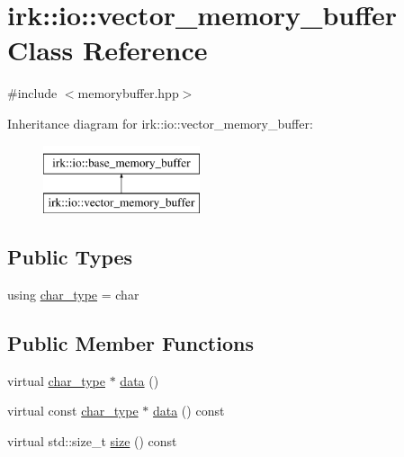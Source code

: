 \hypertarget{classirk_1_1io_1_1vector__memory__buffer}{}\section{irk\+:\+:io\+:\+:vector\+\_\+memory\+\_\+buffer Class Reference}
\label{classirk_1_1io_1_1vector__memory__buffer}


{\ttfamily \#include $<$memorybuffer.\+hpp$>$}

Inheritance diagram for irk\+:\+:io\+:\+:vector\+\_\+memory\+\_\+buffer\+:\begin{figure}[H]
\begin{center}
\leavevmode
\includegraphics[height=2.000000cm]{classirk_1_1io_1_1vector__memory__buffer}
\end{center}
\end{figure}
\subsection*{Public Types}
\begin{DoxyCompactItemize}
\item 
using \mbox{\hyperlink{classirk_1_1io_1_1vector__memory__buffer_a3ad38262653ef0610f281f5a321c05de}{char\+\_\+type}} = char
\end{DoxyCompactItemize}
\subsection*{Public Member Functions}
\begin{DoxyCompactItemize}
\item 
virtual \mbox{\hyperlink{classirk_1_1io_1_1base__memory__buffer_a1b539180df4274dd4ad0402a0ac821ec}{char\+\_\+type}} $\ast$ \mbox{\hyperlink{classirk_1_1io_1_1vector__memory__buffer_a28ddafbb2610a463d13dc7fe5cf0708f}{data}} ()
\item 
virtual const \mbox{\hyperlink{classirk_1_1io_1_1base__memory__buffer_a1b539180df4274dd4ad0402a0ac821ec}{char\+\_\+type}} $\ast$ \mbox{\hyperlink{classirk_1_1io_1_1vector__memory__buffer_ad0d18022442c081ac51abb8da8b68e54}{data}} () const
\item 
virtual std\+::size\+\_\+t \mbox{\hyperlink{classirk_1_1io_1_1vector__memory__buffer_ab79eda0d916da980b78ecae09883bba1}{size}} () const
\end{DoxyCompactItemize}


